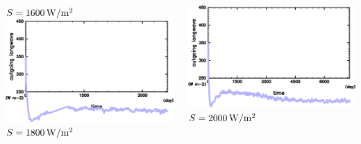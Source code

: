 \documentclass[aspectratio=149,9pt,fleqn]{beamer}
\begin{document}
\begin{frame}
\begin{columns}[T]
\begin{column}{.3\textwidth}
			\(S=1600\hmu{W/m^2}\)\\
			\includegraphics[width=\textwidth]{S1800/S1800_OLRA_horimean_time0.0-3650.0-crop.png}
			\(S=1800\hmu{W/m^2}\)
		\end{column}
		\begin{column}{.3\textwidth}
			\centering
			\includegraphics[width=\textwidth]{S2000/S2000_OLRA_horimean_time0.0-7300.0-crop.png}
			\(S=2000\hmu{W/m^2}\)
		\end{column}
	\end{columns}
\end{frame}
\end{document}
